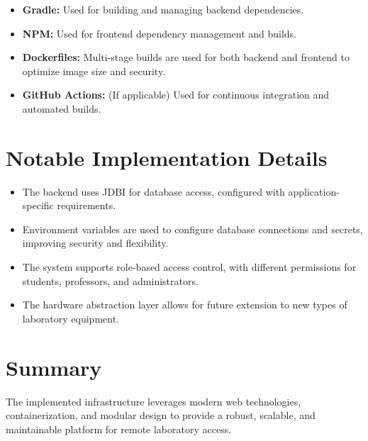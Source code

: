 \begin{itemize}
    \item \textbf{Gradle:} Used for building and managing backend dependencies.
    \item \textbf{NPM:} Used for frontend dependency management and builds.
    \item \textbf{Dockerfiles:} Multi-stage builds are used for both backend and frontend to optimize image size and security.
    \item \textbf{GitHub Actions:} (If applicable) Used for continuous integration and automated builds.
\end{itemize}

\section{Notable Implementation Details}

\begin{itemize}
    \item The backend uses JDBI for database access, configured with application-specific requirements.
    \item Environment variables are used to configure database connections and secrets, improving security and flexibility.
    \item The system supports role-based access control, with different permissions for students, professors, and administrators.
    \item The hardware abstraction layer allows for future extension to new types of laboratory equipment.
\end{itemize}

\section{Summary}

The implemented infrastructure leverages modern web technologies, containerization, and modular design to provide a robust, scalable, and maintainable platform for remote laboratory access.